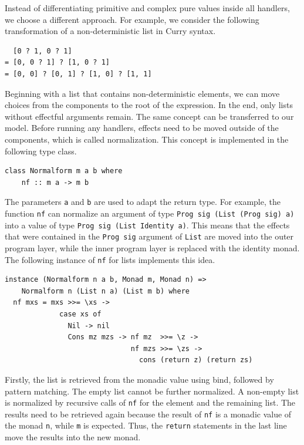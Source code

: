 \documentclass[a4paper, 11pt, fleqn, twoside, abstract=on]{scrreprt}
\newcommand{\hinl}[1]{\texttt{#1}}
\begin{document}
Instead of differentiating primitive and complex pure values inside all handlers, we choose a different approach.
For example, we consider the following transformation of a non-deterministic list in Curry syntax.

\begin{verbatim}
  [0 ? 1, 0 ? 1]
= [0, 0 ? 1] ? [1, 0 ? 1]
= [0, 0] ? [0, 1] ? [1, 0] ? [1, 1]
\end{verbatim}

Beginning with a list that contains non-deterministic elements, we can move choices from the components to the root of the expression.
In the end, only lists without effectful arguments remain.
The same concept can be transferred to our model.
Before running any handlers, effects need to be moved outside of the components, which is called normalization.
This concept is implemented in the following type class.

\begin{verbatim}
class Normalform m a b where
    nf :: m a -> m b
\end{verbatim}
\noindent
The parameters \hinl{a} and \hinl{b} are used to adapt the return type.
For example, the function \hinl{nf} can normalize an argument of type \hinl{Prog sig (List (Prog sig) a)} into a value of type \hinl{Prog sig (List Identity a)}.
This means that the effects that were contained in the \hinl{Prog sig} argument of \hinl{List} are moved into the outer program layer, while the inner program layer is replaced with the identity monad.
The following instance of \hinl{nf} for lists implements this idea.
\pagebreak
\begin{verbatim}
instance (Normalform n a b, Monad m, Monad n) =>
    Normalform n (List n a) (List m b) where
  nf mxs = mxs >>= \xs ->
             case xs of
               Nil -> nil
               Cons mz mzs -> nf mz  >>= \z ->
                              nf mzs >>= \zs ->
                                cons (return z) (return zs)
\end{verbatim}
\noindent
Firstly, the list is retrieved from the monadic value using bind, followed by pattern matching.
The empty list cannot be further normalized.
A non-empty list is normalized by recursive calls of \hinl{nf} for the element and the remaining list.
The results need to be retrieved again because the result of \hinl{nf} is a monadic value of the monad \hinl{n}, while \hinl{m} is expected.
Thus, the \hinl{return} statements in the last line move the results into the new monad.
\end{document}
